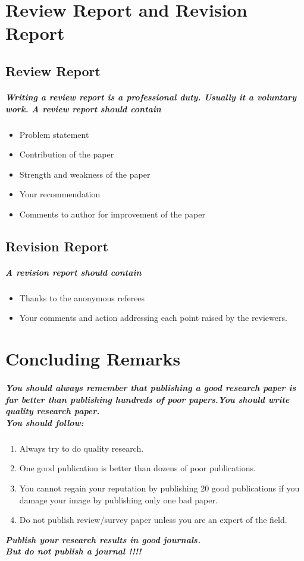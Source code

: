 \documentclass[20pt]{report}
\begin{document}
\chapter{Review Report and Revision Report}
\section{Review Report}
\paragraph{ Writing a review report is a professional duty. Usually it a
voluntary work.
A review report should contain}
\begin{itemize}
\item Problem statement
\item Contribution of the paper
\item Strength and weakness of the paper
\item Your recommendation
\item Comments to author for improvement of the paper
\end{itemize}
\section{Revision Report}
\paragraph{ A revision report should contain}
\begin{itemize}
\item Thanks to the anonymous referees
\item Your comments and action addressing each point raised by
the reviewers.
\end{itemize}

\chapter{Concluding Remarks}
\paragraph{You should always remember that publishing a good research paper is far better than publishing hundreds of poor papers.You should write quality research paper.\\You should follow: }
\begin{enumerate}
\item Always try to do quality research.
\item One good publication is better than dozens of poor
publications.
\item You cannot regain your reputation by publishing 20 good
publications if you damage your image by publishing only
one bad paper.
\item Do not publish review/survey paper unless you are an
expert of the field.
\end{enumerate}
\begin{center}
\emph {\textbf {Publish your research results in good journals.\\}}
\emph{\textbf{But do not publish a journal !!!!}}
\end{center}
\end{document}
